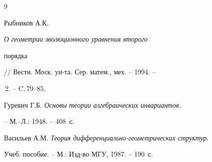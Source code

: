 \begin{thebibliography}{9} 


 




Рыбников А.К. {\em О геометрии эволюционного уравнения второго  


порядка} // Вестн. Моск. ун-та. Сер. матем., мех. -- 1994. --  


\No\,2. -- C.\,79--85. 




Гуревич Г.Б. {\em Основы теории алгебраических инвариантов}. 


-- М.--Л.: 1948. -- 408~с. 




Васильев А.М. {\em Теория дифференциально-геометрических структур}. 


Учеб. пособие. -- М.: Изд-во МГУ, 1987. -- 190~с. 


 


\end{thebibliography} 


 


\vskip 2cm 


 






 


\label{end} 


 


